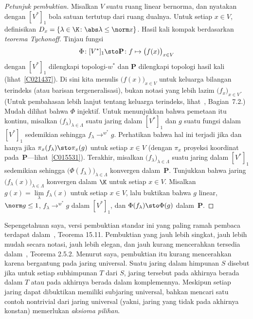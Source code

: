 \begin{proof}[\emph{Petunjuk pembuktian}] Misalkan $V$ suatu ruang linear bernorma, dan nyatakan dengan $[V^*]_1$ bola satuan tertutup dari
ruang dualnya.  Untuk setiap $x \in V$, definisikan $D_x = \{\lambda \in \K \colon \abs\lambda \le \norm x\}$.  Hasil kali
 kompak berdasarkan \emph{teorema Tychonoff}.  Tinjau fungsi
   \[ \Phi\colon [V^*]_1 \sto \mathbf P \colon f \mapsto \bigl(f(x)\bigr)_{x \in V} \]
dengan $[V^*]_1$ dilengkapi topologi-$w^*$ dan $\mathbf P$ dilengkapi topologi hasil kali (lihat~\ref{C021437}).  Di sini kita menulis
$\bigl(f(x)\bigr)_{x \in V}$ untuk keluarga bilangan terindeks (atau barisan tergeneralisasi), bukan notasi yang lebih lazim
$\bigl(f_x\bigr)_{x \in V}$.  (Untuk pembahasan lebih lanjut tentang keluarga terindeks, lihat~\cite{Erdman:2007}, Bagian~7.2.)  Mudah dilihat bahwa
$\Phi$ injektif.  Untuk menunjukkan bahwa pemetaan itu kontinu, misalkan $\bigl(f_\lambda\bigr)_{\lambda \in \Lambda}$ suatu jaring dalam $[V^*]_1$
dan $g$ suatu fungsi dalam $[V^*]_1$ sedemikian sehingga $f_\lambda \to^{w^*} g$.  Perhatikan bahwa hal ini terjadi jika dan hanya jika
$\pi_x(f_\lambda) \sto \pi_x(g)$ untuk setiap $x \in V$ (dengan $\pi_x$ proyeksi koordinat pada~$\mathbf P$---lihat~\ref{C015531}).
Terakhir, misalkan $\bigl(f_\lambda\bigr)_{\lambda \in \Lambda}$ suatu jaring dalam $[V^*]_1$ sedemikian sehingga $\bigl(\Phi(f_\lambda)\bigr)_{\lambda \in \Lambda}$
konvergen dalam~$\mathbf P$.  Tunjukkan bahwa jaring $\bigl(f_\lambda(x)\bigr)_{\lambda \in \Lambda}$ konvergen dalam $\K$ untuk setiap $x \in V$.
Misalkan $g(x) = \lim\limits_\lambda f_\lambda(x)$ untuk setiap $x \in V$, lalu buktikan bahwa $g$ linear, $\norm g \le 1$,
$f_\lambda \to^{w^*} g$ dalam $[V^*]_1$, dan $\Phi(f_\lambda) \sto \Phi(g)$ dalam~$\mathbf P$.  \ns
\end{proof}

Sepengetahuan saya, versi pembuktian standar ini yang paling ramah pembaca terdapat dalam~\cite{BrownP:1977}, Teorema 15.11.
Pembuktian yang jauh lebih singkat, jauh lebih mudah secara notasi, jauh lebih elegan, dan jauh kurang mencerahkan tersedia dalam~\cite{Pedersen:1995}, Teorema 2.5.2.
Menurut saya, pembuktian itu kurang mencerahkan karena bergantung pada jaring universal.  Suatu jaring dalam himpunan $S$ disebut
 jika untuk setiap subhimpunan $T$ dari $S$, jaring tersebut pada akhirnya berada dalam $T$ atau pada akhirnya berada dalam komplemennya. Meskipun
setiap jaring dapat dibuktikan memiliki subjaring universal, bahkan mencari satu contoh nontrivial dari jaring universal (yakni, jaring yang tidak
pada akhirnya konstan) memerlukan \emph{aksioma pilihan}.






